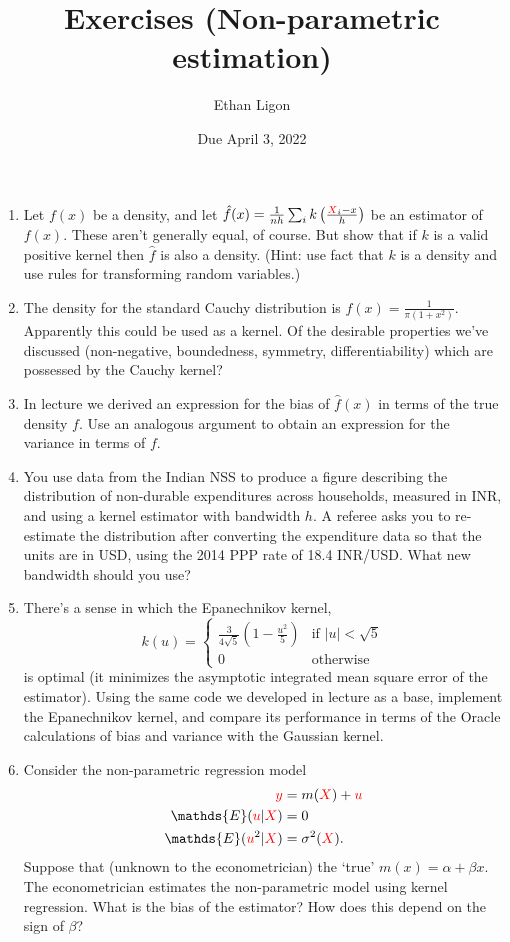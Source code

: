 \documentclass[12pt]{amsart}
\author{Ethan Ligon}
\date{Due April 3, 2022}
\title{Exercises (Non-parametric estimation)}
\newcommand{\rv}[1]{\ensuremath{\textcolor{red}{#1}{}}}
\newcommand{\rvy}{\rv{y}}
\newcommand{\rvX}{\rv{X}}
\newcommand{\rvu}{\rv{u}}
\renewcommand{\E}{\ensuremath{\mathds{E}}}
\begin{document}
\maketitle
\begin{enumerate}
\item Let \(f(x)\) be a density, and let \(\hat{f}(x)=\frac{1}{nh}\sum_i
     k\left(\frac{\rvX_i-x}{h}\right)\) be an estimator of \(f(x)\).
These aren't generally equal, of course.  But show that if \(k\) is
a valid positive kernel then \(\hat{f}\) is also a density. (Hint:
use fact that \(k\) is a density and use rules for transforming
random variables.)
\item The density for the standard Cauchy distribution is
\(f(x)=\frac{1}{\pi(1+x^2)}\).  Apparently this could be used as a
kernel.  Of the desirable properties we've discussed
(non-negative, boundedness, symmetry, differentiability) which
are possessed by the Cauchy kernel?
\item In lecture we derived an expression for the bias of \(\hat{f}(x)\)
in terms of the true density \(f\).  Use an analogous argument to
obtain an expression for the variance in terms of \(f\).
\item You use data from the Indian NSS to produce a figure describing
the distribution of non-durable expenditures across households,
measured in INR, and using a kernel estimator with bandwidth \(h\).
A referee asks you to re-estimate the distribution after
converting the expenditure data so that the units are in
USD, using the 2014 PPP rate of 18.4 INR/USD.  What new bandwidth
should you use?
\item There's a sense in which the Epanechnikov kernel, 
\[
     {}  k(u) = \begin{cases} 
                  \frac{3}{4\sqrt{5}}\left(1-\frac{u^2}{5}\right) &
     \text{if $|u|<\sqrt{5}$}\\
     {}              0 & \text{otherwise} \end{cases}
     \] 
is optimal (it minimizes the asymptotic integrated mean square
error of the estimator).  Using the same code we developed in
lecture as a base, implement the Epanechnikov kernel, and compare
its performance in terms of the Oracle calculations of bias and
variance with the Gaussian kernel.
\item Consider the non-parametric regression model
   \begin{align*}
 \rvy &= m(\rvX) + \rvu\\
 \E(\rvu|\rvX) &= 0\\
 \E(\rvu^2|\rvX) &= \sigma^2(\rvX).
\end{align*}
Suppose that (unknown to the econometrician) the `true' \(m(x) =
     \alpha + \beta x\).  The econometrician estimates the
 non-parametric model using kernel regression.  What is the bias
 of the estimator?  How does this depend on the sign of \(\beta\)?
\end{enumerate}
\end{document}

